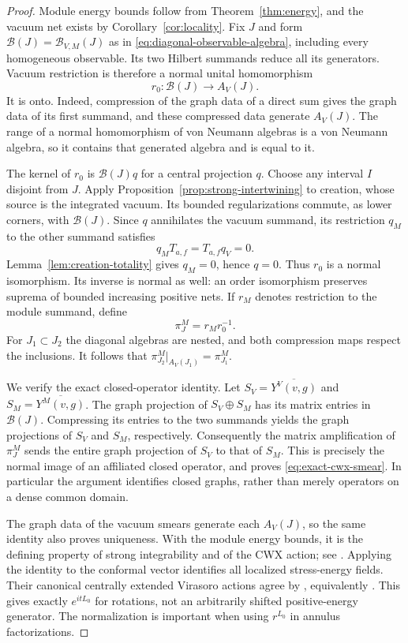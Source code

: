 \begin{proof}
Module energy bounds follow from Theorem~\ref{thm:energy}, and the
vacuum net exists by Corollary~\ref{cor:locality}.
Fix $J$ and form $\mathcal B(J)=\mathcal B_{V,M}(J)$ as in
\eqref{eq:diagonal-observable-algebra}, including every homogeneous
observable.  Its two Hilbert summands reduce all its generators.
Vacuum restriction is therefore a normal unital homomorphism
\[
 r_0:\mathcal B(J)\longrightarrow A_V(J).
\]
It is onto.  Indeed, compression of the graph data of a direct sum
gives the graph data of its first summand, and these compressed data
generate $A_V(J)$.  The range of a normal homomorphism of von Neumann
algebras is a von Neumann algebra, so it contains that generated
algebra and is equal to it.

The kernel of $r_0$ is $\mathcal B(J)q$ for a central projection $q$.
Choose any interval $I$ disjoint from $J$.  Apply
Proposition~\ref{prop:strong-intertwining} to creation, whose source
is the integrated vacuum.  Its bounded regularizations commute, as
lower corners, with $\mathcal B(J)$.  Since $q$ annihilates the vacuum
summand, its restriction $q_M$ to the other summand satisfies
\[
 q_MT_{a,f}=T_{a,f}q_V=0.
\]
Lemma~\ref{lem:creation-totality} gives $q_M=0$, hence $q=0$.
Thus $r_0$ is a normal isomorphism.  Its inverse is normal as well:
an order isomorphism preserves suprema of bounded increasing positive
nets.  If $r_M$ denotes restriction to the module summand, define
\[
 \pi_J^M=r_Mr_0^{-1}.
\]
For $J_1\subset J_2$ the diagonal algebras are nested, and both
compression maps respect the inclusions.  It follows that
$\pi_{J_2}^M|_{A_V(J_1)}=\pi_{J_1}^M$.

We verify the exact closed-operator identity.
Let $S_V=\overline{Y^V(v,g)}$ and
$S_M=\overline{Y^M(v,g)}$.
The graph projection of $S_V\oplus S_M$ has its matrix entries in
$\mathcal B(J)$.  Compressing its entries to the two summands yields
the graph projections of $S_V$ and $S_M$, respectively.
Consequently the matrix amplification of $\pi_J^M$ sends the entire
graph projection of $S_V$ to that of $S_M$.  This is precisely the
normal image of an affiliated closed operator, and proves
\eqref{eq:exact-cwx-smear}.  In particular the argument identifies
closed graphs, rather than merely operators on a dense common domain.

The graph data of the vacuum smears generate each $A_V(J)$, so the
same identity also proves uniqueness.  With the module energy bounds,
it is the defining property of strong integrability and of the CWX
action; see \cite[Definition~4.22]{GuiExtensions}.
Applying the identity to the conformal vector identifies all localized
stress-energy fields.  Their canonical centrally extended Virasoro
actions agree by \cite[Proposition~3.10]{GuiUnbounded}, equivalently
\cite[Remark~4.23]{GuiExtensions}.  This gives exactly $e^{itL_0}$
for rotations, not an arbitrarily shifted positive-energy generator.
The normalization is important when using $r^{L_0}$ in annulus
factorizations.
\end{proof}


